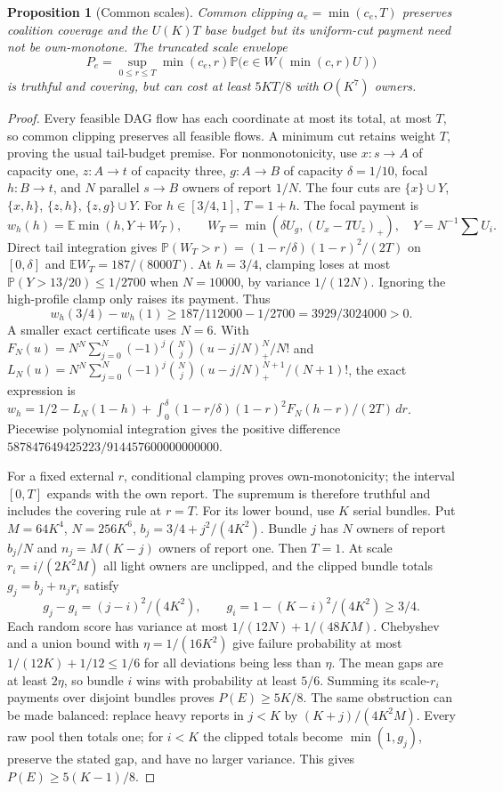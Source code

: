 \documentclass[11pt]{article}
\newtheorem{proposition}[theorem]{Proposition}
\theoremstyle{definition}\newtheorem{definition}[theorem]{Definition}
\theoremstyle{remark}\newtheorem{remark}[theorem]{Remark}
\newcommand{\E}{\mathbb E}
\newcommand{\Prob}{\mathbb P}
\begin{document}
\begin{proposition}[Common scales]\label{noise:scales}
Common clipping $a_e=\min(c_e,T)$ preserves coalition coverage and the
$U(K)T$ base budget but its uniform-cut payment need not be own-monotone.
The truncated scale envelope
\[
 P_e=\sup_{0\le r\le T}\min(c_e,r)
       \Prob\bigl(e\in W(\min(c,r)U)\bigr)
\]
is truthful and covering, but can cost at least $5KT/8$ with $O(K^7)$ owners.
\end{proposition}
\begin{proof}
Every feasible DAG flow has each coordinate at most its total, at most $T$,
so common clipping preserves all feasible flows. A minimum cut retains
weight $T$, proving the usual tail-budget premise.
For nonmonotonicity, use $x:s\to A$ of capacity one, $z:A\to t$ of
capacity three, $g:A\to B$ of capacity $\delta=1/10$, focal $h:B\to t$,
and $N$ parallel $s\to B$ owners of report $1/N$.
The four cuts are $\{x\}\cup Y$, $\{x,h\}$, $\{z,h\}$,
$\{z,g\}\cup Y$. For $h\in[3/4,1]$, $T=1+h$.
The focal payment is
\[
 w_h(h)=\E\min(h,Y+W_T),\qquad
 W_T=\min(\delta U_g,(U_x-TU_z)_+),\quad
 Y=N^{-1}\sum U_i.
\]
Direct tail integration gives
$\Prob(W_T>r)=(1-r/\delta)(1-r)^2/(2T)$ on $[0,\delta]$ and
$\E W_T=187/(8000T)$. At $h=3/4$, clamping loses at most
$\Prob(Y>13/20)\le1/2700$ when $N=10000$, by variance $1/(12N)$.
Ignoring the high-profile clamp only raises its payment. Thus
\[
 w_h(3/4)-w_h(1)\ge187/112000-1/2700=3929/3024000>0.
\]
A smaller exact certificate uses $N=6$. With
$F_N(u)=N^N\sum_{j=0}^N(-1)^j\binom Nj(u-j/N)_+^N/N!$ and
$L_N(u)=N^N\sum_{j=0}^N(-1)^j\binom Nj(u-j/N)_+^{N+1}/(N+1)!$,
the exact expression is
$w_h=1/2-L_N(1-h)+\int_0^\delta
(1-r/\delta)(1-r)^2F_N(h-r)/(2T)\,dr$.
Piecewise polynomial integration gives the positive difference
$587847649425223/914457600000000000$.

For a fixed external $r$, conditional clamping proves own-monotonicity;
the interval $[0,T]$ expands with the own report. The supremum is therefore
truthful and includes the covering rule at $r=T$.
For its lower bound, use $K$ serial bundles. Put $M=64K^4$, $N=256K^6$,
$b_j=3/4+j^2/(4K^2)$. Bundle $j$ has $N$ owners of report $b_j/N$ and
$n_j=M(K-j)$ owners of report one. Then $T=1$.
At scale $r_i=i/(2K^2M)$ all light owners are unclipped, and the clipped
bundle totals $g_j=b_j+n_jr_i$ satisfy
\[
 g_j-g_i=(j-i)^2/(4K^2),\qquad g_i=1-(K-i)^2/(4K^2)\ge3/4.
\]
Each random score has variance at most $1/(12N)+1/(48KM)$.
Chebyshev and a union bound with $\eta=1/(16K^2)$ give failure probability
at most $1/(12K)+1/12\le1/6$ for all deviations being less than $\eta$.
The mean gaps are at least $2\eta$, so bundle $i$ wins with probability
at least $5/6$. Summing its scale-$r_i$ payments over disjoint bundles
proves $P(E)\ge5K/8$.
The same obstruction can be made balanced: replace heavy reports in
$j<K$ by $(K+j)/(4K^2M)$. Every raw pool then totals one; for $i<K$
the clipped totals become $\min(1,g_j)$, preserve the stated gap, and have
no larger variance. This gives $P(E)\ge5(K-1)/8$.
\end{proof}
\end{document}
